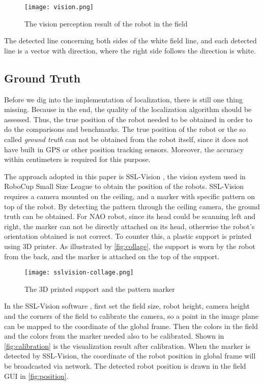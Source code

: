 \begin{figure}[h!]
  \centering
  \texttt{[image: vision.png]}
  \caption{The vision perception result of the robot in the field}
  \label{fig:perception}
\end{figure}

The detected line concerning both sides of the white field line, and each detected line is a vector with direction, where the right side follows the direction is white.

\subsection{Ground Truth}\label{sub:ground truth}
Before we dig into the implementation of localization, there is still one thing missing. Because in the end, the quality of the localization algorithm should be assessed. Thus, the true position of the robot needed to be obtained in order to do the comparisons and benchmarks. The true position of the robot or the so called \textit{ground truth} can not be obtained from the robot itself, since it does not have built in \gls{GPS} or other position tracking sensors. Moreover, the accuracy within centimeters is required for this purpose. 

The approach adopted in this paper is SSL-Vision \cite{zickler2010ssl}, the vision system used in RoboCup Small Size League to obtain the position of the robots. SSL-Vision requires a camera mounted on the ceiling, and a marker with specific pattern on top of the robot. By detecting the pattern through the ceiling camera, the ground truth can be obtained. For NAO robot, since its head could be scanning left and right, the marker can not be directly attached on its head, otherwise the robot's orientation obtained is not correct. To counter this, a plastic support is printed using 3D printer. As illustrated by \autoref{fig:collage}, the support is worn by the robot from the back, and the marker is attached on the top of the support.

\begin{figure}[h!]
  \centering
  \texttt{[image: sslvision-collage.png]}
  \caption{The 3D printed support and the pattern marker}
  \label{fig:collage}
\end{figure}

In the SSL-Vision software \cite{sslvision_yuan}, first set the field size, robot height, camera height and the corners of the field to calibrate the camera, so a point in the image plane can be mapped to the coordinate of the global frame. Then the colors in the field and the colors from the marker needed also to be calibrated. Shown in \autoref{fig:calibration} is the visualization result after calibration. When the marker is detected by SSL-Vision, the coordinate of the robot position in global frame will be broadcasted via network. The detected robot position is drawn in the field GUI in \autoref{fig:position}.\\


